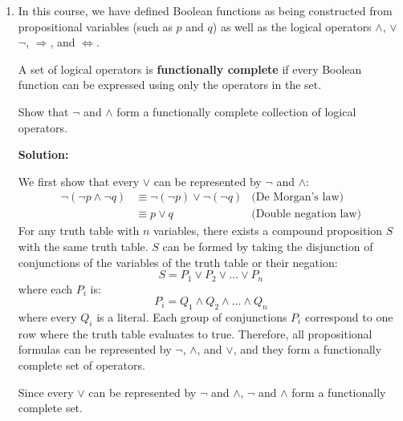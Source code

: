 \documentclass{article}
\newenvironment{solution}
{
\medskip
\par
\color{blue}
\textbf{Solution:}
}
{
\medskip
\par
}
\begin{document}
\begin{enumerate}
    \item In this course, we have defined Boolean functions as being constructed from propositional variables (such as $p$ and $q$) as well as the logical operators $\land$, $\lor$ $\neg$, $\Rightarrow$, and $\Leftrightarrow$.

    \vspace{1.5mm}
    A set of logical operators is \textbf{functionally complete} if every Boolean function can be expressed using only the operators in the set.
    
    \vspace{1.5mm}
    Show that $\neg$ and $\land$ form a functionally complete collection of logical operators.
    
    \begin{solution}
        We first show that every $\vee$ can be represented by $\lnot$ and $\land$:
        \begin{align*}
            \lnot(\lnot p \land \lnot q) &\equiv 
            \lnot(\lnot p) \vee \lnot(\lnot q) &\text{(De Morgan's law)} \\ &\equiv
            p \vee q &\text{(Double negation law)}
        \end{align*}
        For any truth table with $n$ variables, there exists a compound proposition $S$ with the same truth table. $S$ can be formed by taking the disjunction of conjunctions of the variables of the truth table or their negation: 
        \begin{equation*}
            S=P_1 \vee P_2 \vee \ldots \vee P_n
        \end{equation*}
        where each $P_i$ is:
        \begin{equation*}
            P_i=Q_1 \land Q_2 \land \ldots \land Q_n
        \end{equation*}
        where every $Q_i$ is a literal. Each group of conjunctions $P_i$ correspond to one row where the truth table evaluates to true. Therefore, all propositional formulas can be represented by $\lnot$, $\land$, and $\vee$, and they form a functionally complete set of operators.

        Since every $\vee$ can be represented by $\lnot$ and $\land$, $\lnot$ and $\land$ form a functionally complete set.
    \end{solution}

\end{enumerate}
\end{document}
